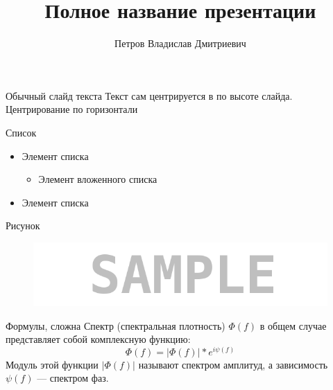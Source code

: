 \documentclass[11pt]{beamer}
\author[Петров В.Д.]{Петров Владислав Дмитриевич}
\title[Краткое название]{Полное название презентации}
\date{\the\year}
\begin{document}
\begin{frame}
\titlepage
\end{frame}


\begin{frame}{Обычный слайд текста}
Текст сам центрируется в по высоте слайда. Центрирование по горизонтали 
\end{frame}


\begin{frame}{Список}
\begin{itemize}
	\item Элемент списка
	\begin{itemize}
		\item Элемент вложенного списка
	\end{itemize}
	\item Элемент списка
\end{itemize}
\end{frame}


\begin{frame}{Рисунок}
\begin{figure}[H]
	\includegraphics[scale=0.4]{pics/sample}
	\label{fig:sample}
\end{figure}
\end{frame}


\begin{frame}{Формулы, сложна}
Спектр (спектральная плотность) $\Phi(f)$ в общем случае представляет собой комплексную функцию: $$\Phi(f)=|\Phi(f)|*e^{i\psi(f)}$$
Модуль этой функции $|\Phi(f)|$ называют спектром амплитуд, а зависимость $\psi(f)$ — спектром фаз.
\end{frame}
\end{document}
